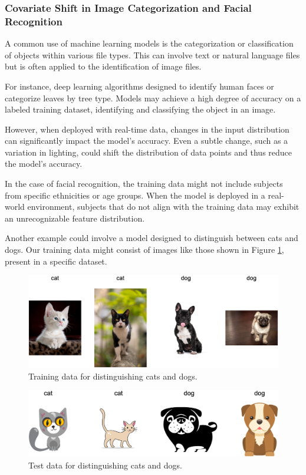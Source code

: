 \subsubsection{Covariate Shift in Image Categorization and Facial Recognition}

A common use of machine learning models is the categorization or classification of objects within various file types. This can involve text or natural language files but is often applied to the identification of image files.

For instance, deep learning algorithms designed to identify human faces or categorize leaves by tree type. Models may achieve a high degree of accuracy on a labeled training dataset, identifying and classifying the object in an image.
 
However, when deployed with real-time data, changes in the input distribution can significantly impact the model's accuracy. Even a subtle change, such as a variation in lighting, could shift the distribution of data points and thus reduce the model's accuracy.

In the case of facial recognition, the training data might not include subjects from specific ethnicities or age groups. When the model is deployed in a real-world environment, subjects that do not align with the training data may exhibit an unrecognizable feature distribution.

Another example could involve a model designed to distinguish between cats and dogs. Our training data might consist of images like those shown in Figure \cref{fig:cani-gatti-tr}, present in a specific dataset.

\vspace{0.5cm}
\begin{figure}[H]
    \centering
    \includegraphics[width=1\textwidth]{../src/assets/cat-dog-train.png} 
    \caption{Training data for distinguishing cats and dogs.}
    \label{fig:cani-gatti-tr}
\end{figure}

\begin{figure}[H]
    \centering
    \includegraphics[width=1\textwidth]{../src/assets/cat-dog-test.png} 
    \caption{Test data for distinguishing cats and dogs.}
    \label{fig:cani-gatti-ts}
\end{figure}

